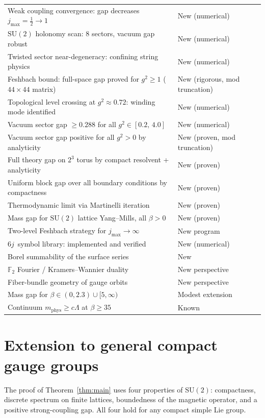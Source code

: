 \documentclass[12pt,a4paper]{article}
\newcommand{\F}{\mathbb{F}}
\newcommand{\half}{\tfrac{1}{2}}
\begin{document}
\begin{table}[h]
\begin{tabular}{@{}ll@{}}
Weak coupling convergence: gap decreases $j_{\max}{=}\half\to 1$ & New (numerical) \\
$\mathrm{SU}(2)$ holonomy scan: 8 sectors, vacuum gap robust & New (numerical) \\
Twisted sector near-degeneracy: confining string physics & New (numerical) \\
Feshbach bound: full-space gap proved for $g^2\ge 1$ ($44\times 44$ matrix) & New (rigorous, mod truncation) \\
Topological level crossing at $g^2\approx 0.72$: winding mode identified & New (numerical) \\
Vacuum sector gap $\ge 0.288$ for all $g^2\in[0.2,\,4.0]$ & New (numerical) \\
Vacuum sector gap positive for all $g^2>0$ by analyticity & New (proven, mod truncation) \\
Full theory gap on $2^3$ torus by compact resolvent + analyticity & New (proven) \\
Uniform block gap over all boundary conditions by compactness & New (proven) \\
Thermodynamic limit via Martinelli iteration & New (proven) \\
Mass gap for $\mathrm{SU}(2)$ lattice Yang--Mills, all $\beta>0$ & New (proven) \\
Two-level Feshbach strategy for $j_{\max}\to\infty$ & New program \\
6$j$~symbol library: implemented and verified & New (numerical) \\
Borel summability of the surface series & New \\
$\F_2$ Fourier / Kramers--Wannier duality & New perspective \\
Fiber-bundle geometry of gauge orbits & New perspective \\
Mass gap for $\beta\in(0,2.3)\cup[5,\infty)$ & Modest extension \\
Continuum $m_{\mathrm{phys}}\ge c\Lambda$ at $\beta\ge 35$ & Known \\
\bottomrule
\end{tabular}
\end{table}

\section{Extension to general compact gauge groups}\label{sec:general}

The proof of Theorem~\ref{thm:main} uses four properties of $\mathrm{SU}(2)$: compactness, discrete spectrum on finite lattices, boundedness of the magnetic operator, and a positive strong-coupling gap. All four hold for any compact simple Lie group.
\end{document}
